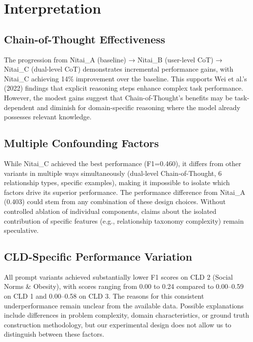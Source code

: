 \section{Interpretation}

\subsection{Chain-of-Thought Effectiveness}

The progression from Nitai\_A (baseline) → Nitai\_B (user-level CoT) → Nitai\_C (dual-level CoT) demonstrates incremental performance gains, with Nitai\_C achieving 14\% improvement over the baseline. This supports Wei et al.'s (2022) findings that explicit reasoning steps enhance complex task performance. However, the modest gains suggest that Chain-of-Thought's benefits may be task-dependent and diminish for domain-specific reasoning where the model already possesses relevant knowledge.

\subsection{Multiple Confounding Factors}

While Nitai\_C achieved the best performance (F1=0.460), it differs from other variants in multiple ways simultaneously (dual-level Chain-of-Thought, 6 relationship types, specific examples), making it impossible to isolate which factors drive its superior performance. The performance difference from Nitai\_A (0.403) could stem from any combination of these design choices. Without controlled ablation of individual components, claims about the isolated contribution of specific features (e.g., relationship taxonomy complexity) remain speculative.

\subsection{CLD-Specific Performance Variation}

All prompt variants achieved substantially lower F1 scores on CLD 2 (Social Norms \& Obesity), with scores ranging from 0.00 to 0.24 compared to 0.00--0.59 on CLD 1 and 0.00--0.58 on CLD 3. The reasons for this consistent underperformance remain unclear from the available data. Possible explanations include differences in problem complexity, domain characteristics, or ground truth construction methodology, but our experimental design does not allow us to distinguish between these factors.

